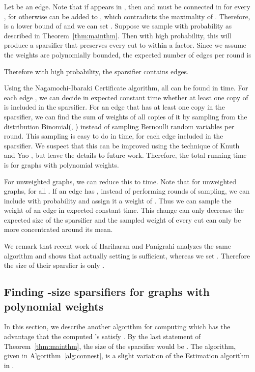 \documentclass[11pt]{article}
\numberwithin{equation}{section}
\newcommand{\Algorithm}[1]{Algorithm~\ref{alg:#1}}
\newcommand{\Theorem}[1]{Theorem~\ref{thm:#1}}
\begin{document}
Let  be an edge.
Note that if  appears in , 
then  and  must be connected in  for every ,
for otherwise  can be added to ,
which contradicts the maximality of .
Therefore,  is a lower bound of 
and we can set .
Suppose we sample with probability  as described in \Theorem{mainthm}.
Then with high probability, this will produce a sparsifier that
preserves every cut to within a  factor.
Since we assume the weights are polynomially bounded,
the expected number of edges per round is 

Therefore with high probability,
the sparsifier contains  edges.

Using the Nagamochi-Ibaraki Certificate algorithm,
all  can be found in  time.
For each edge , we can decide in expected constant time 
whether at least one copy of  is included in the sparsifier.
For an edge that has at least one copy in the sparsifier,
we can find the sum of weights of all copies of it 
by sampling from the distribution Binomial(, )
instead of sampling  Bernoulli random variables per round.
This sampling is easy to do in
 time,
for each edge included in the sparsifier.
We suspect that this can be improved using the technique of Knuth and Yao
\cite{KnuthYao} \cite[Ch.~15]{Devroye},
but leave the details to future work.
Therefore, the total running time is  for graphs with polynomial weights.

For unweighted  graphs, we can reduce this to  time.
Note that for unweighted graphs,  for all .
If an edge  has ,
instead of performing  rounds of sampling,
we can include  with probability  and assign it a weight of .
Thus we can sample the weight of an edge in expected constant time.
This change can only decrease the expected size of the sparsifier
and the sampled weight of every cut can only be more concentrated around its mean.

We remark that recent work of Hariharan and Panigrahi \cite{HP}
analyzes the same algorithm and shows that 
actually setting  is sufficient,
whereas we set .
Therefore the size of their sparsfier is only .


\subsection{Finding -size sparsifiers for graphs with polynomial weights}

In this section, we describe another algorithm for computing 
which has the advantage that the computed 's
satisfy . 
By the last statement of \Theorem{mainthm},
the size of the sparsifier would be .
The algorithm, given in \Algorithm{connest},
is a slight variation of the Estimation algorithm in \cite{BK}.
\end{document}
